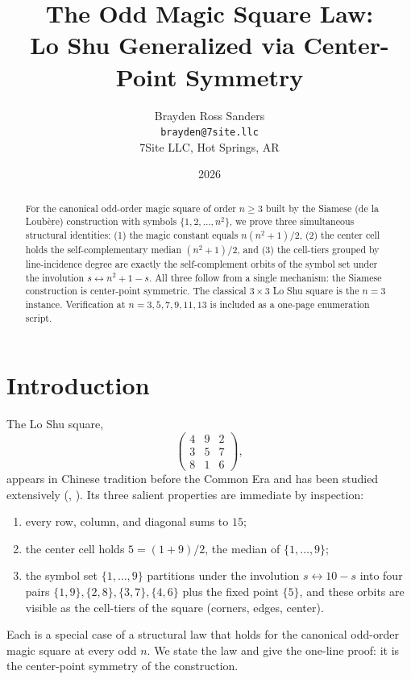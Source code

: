 \documentclass[11pt]{article}
\title{The Odd Magic Square Law:\\
       Lo Shu Generalized via Center-Point Symmetry}
\author{Brayden Ross Sanders\\
        \texttt{brayden@7site.llc}\\
        7Site LLC, Hot Springs, AR}
\date{2026}
\begin{document}
\maketitle

\begin{abstract}
For the canonical odd-order magic square of order $n \geq 3$ built by the
Siamese (de la Loub\`ere) construction with symbols $\{1, 2, \ldots, n^2\}$,
we prove three simultaneous structural identities: (1) the magic constant equals
$n(n^2+1)/2$, (2) the center cell holds the self-complementary median
$(n^2+1)/2$, and (3) the cell-tiers grouped by line-incidence degree are
exactly the self-complement orbits of the symbol set under the involution
$s \leftrightarrow n^2 + 1 - s$. All three follow from a single mechanism:
the Siamese construction is center-point symmetric. The classical $3 \times 3$
Lo Shu square is the $n = 3$ instance. Verification at $n = 3, 5, 7, 9, 11, 13$
is included as a one-page enumeration script.
\end{abstract}

\section{Introduction}

The Lo Shu square,
\[
\begin{pmatrix} 4 & 9 & 2 \\ 3 & 5 & 7 \\ 8 & 1 & 6 \end{pmatrix},
\]
appears in Chinese tradition before the Common Era and has been studied
extensively (\cite{cammann}, \cite{andrews}). Its three salient properties
are immediate by inspection:
\begin{enumerate}
\item every row, column, and diagonal sums to $15$;
\item the center cell holds $5 = (1+9)/2$, the median of $\{1, \ldots, 9\}$;
\item the symbol set $\{1, \ldots, 9\}$ partitions under the involution
      $s \leftrightarrow 10 - s$ into four pairs $\{1,9\}, \{2,8\}, \{3,7\}, \{4,6\}$
      plus the fixed point $\{5\}$, and these orbits are visible as the
      cell-tiers of the square (corners, edges, center).
\end{enumerate}
Each is a special case of a structural law that holds for the
canonical odd-order magic square at every odd $n$. We state the law and
give the one-line proof: it is the center-point symmetry of the
construction.
\end{document}
